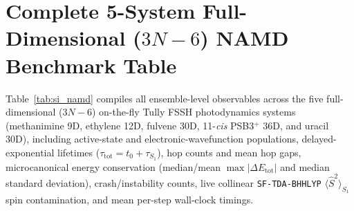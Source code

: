 \documentclass[10pt]{article}
\theoremstyle{natthm}
\newcommand{\Ssq}{\langle\hat{S}^2\rangle}
\begin{document}
\begin{table}[htbp]
  \centering
  \caption{Complete 5-system unconstrained full-$3N$ Cartesian blind analytical MECI discovery and independent multireference verification.}
  \label{tab:si_meci}
\end{table}

\section{Complete 5-System Full-Dimensional \texorpdfstring{($3N{-}6$)}{(3N-6)} NAMD Benchmark Table}

Table~\ref{tab:si_namd} compiles all ensemble-level observables across the five full-dimensional ($3N{-}6$) on-the-fly Tully FSSH photodynamics systems (methanimine 9D, ethylene 12D, fulvene 30D, 11-\emph{cis} PSB3$^+$ 36D, and uracil 30D), including active-state and electronic-wavefunction populations, delayed-exponential lifetimes ($\tau_{\mathrm{tot}} = t_0 + \tau_{S_1}$), hop counts and mean hop gaps, microcanonical energy conservation (median/mean $\max|\Delta E_{\mathrm{tot}}|$ and median standard deviation), crash/instability counts, live collinear \texttt{SF-TDA-BHHLYP} $\Ssq_{S_1}$ spin contamination, and mean per-step wall-clock timings.
\end{document}
